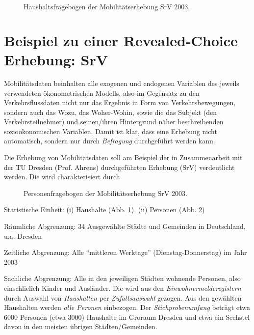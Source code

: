 \begin{figure}
\caption{\label{fig:SrV-Haushalt}Haushaltsfragebogen der
Mobilit\"atserhebung SrV 2003.
}
\end{figure}

\section{\label{sec:erh-mobil}Beispiel zu einer Revealed-Choice
  Erhebung: SrV}
Mobilit\"atsdaten beinhalten alle exogenen und endogenen Variablen des
jeweils verwendeten \"okonometrischen Modells, also im Gegensatz zu den
Verkehrsflussdaten nicht nur das Ergebnis in Form von
Verkehrsbewegungen, sondern auch das Wozu, das Woher-Wohin, sowie die
das Subjekt (den Verkehrsteilnehmer) und seinen/ihren Hintergrund n\"aher beschreibenden
sozio\"okonomischen Variablen. Damit ist klar, dass eine Erhebung
nicht automatisch, sondern nur
durch \textit{Befragung} durch\-gef\"uhrt werden kann. 


Die Erhebung von
Mobilit\"atsdaten soll am Beispiel der in Zusammenarbeit mit der TU
Dresden (Prof. Ahrens) durch\-gef\"uhrten Erhebung  (SrV) verdeutlicht werden.
Die 
wird charakterisiert durch


\begin{figure}
\caption{\label{fig:SrV-Personen}Personenfragebogen der
Mobilit\"atserhebung SrV 2003.
}
\end{figure}

\bi
\item Statistische Einheit: (i) Haushalte
(Abb. \ref{fig:SrV-Haushalt}), (ii) Personen
(Abb. \ref{fig:SrV-Personen}) 
\item R\"aumliche Abgrenzung: 34 Ausgew\"ahlte St\"adte und Gemeinden in Deutschland,
u.a. Dresden
\item Zeitliche Abgrenzung: Alle ``mittleren Werktage''
(Dienstag-Donnerstag) im Jahr 2003
\item Sachliche Abgrenzung: Alle in den jeweiligen St\"adten wohnende
Personen, also einschlie\3lich Kinder und Ausl\"ander.
\ei
%
Die  wird aus den \textit{Einwohnermelderegistern}
durch Auswahl von \textit{Haushalten}  per \textit{Zufallsauswahl}
gezogen.  Aus den gew\"ahlten Haushalten werden \textit{alle Peronen}
einbezogen.
Der \textit{Stichprobenumfang} betr\"agt etwa 6000 Personen (etwa
3000) Haushalte im Gro\3raum Dresden und etwa ein Sechstel davon in
den meisten \"ubrigen St\"adten/Gemeinden.

